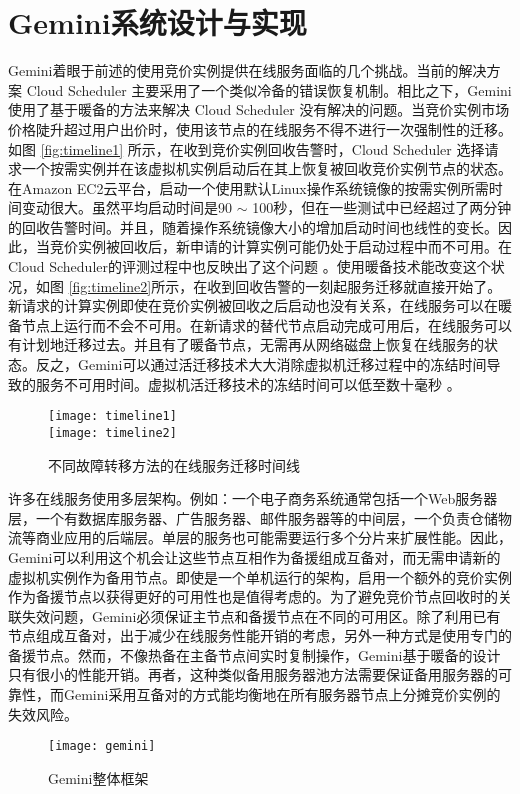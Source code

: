\section{Gemini系统设计与实现}
\label{sec-gemini}
Gemini着眼于前述的使用竞价实例提供在线服务面临的几个挑战。当前的解决方案 Cloud Scheduler \cite{He:2015:CCH:2749246.2749275} 主要采用了一个类似冷备的错误恢复机制。相比之下，Gemini使用了基于暖备的方法来解决 Cloud Scheduler 没有解决的问题。当竞价实例市场价格陡升超过用户出价时，使用该节点的在线服务不得不进行一次强制性的迁移。如图 \ref{fig:timeline1} 所示，在收到竞价实例回收告警时，Cloud Scheduler 选择请求一个按需实例并在该虚拟机实例启动后在其上恢复被回收竞价实例节点的状态。在Amazon EC2云平台，启动一个使用默认Linux操作系统镜像的按需实例所需时间变动很大。虽然平均启动时间是90 $\sim$ 100秒，但在一些测试中已经超过了两分钟的回收告警时间。并且，随着操作系统镜像大小的增加启动时间也线性的变长。因此，当竞价实例被回收后，新申请的计算实例可能仍处于启动过程中而不可用。在Cloud Scheduler的评测过程中也反映出了这个问题 \cite{He:2015:CCH:2749246.2749275}。使用暖备技术能改变这个状况，如图 \ref{fig:timeline2}所示，在收到回收告警的一刻起服务迁移就直接开始了。新请求的计算实例即使在竞价实例被回收之后启动也没有关系，在线服务可以在暖备节点上运行而不会不可用。在新请求的替代节点启动完成可用后，在线服务可以有计划地迁移过去。并且有了暖备节点，无需再从网络磁盘上恢复在线服务的状态。反之，Gemini可以通过活迁移技术大大消除虚拟机迁移过程中的冻结时间导致的服务不可用时间。虚拟机活迁移技术的冻结时间可以低至数十毫秒 \cite{Clark:2005:LMV:1251203.1251223}。
\begin{figure}
  \centering%
    {\texttt{[image: timeline1]}}%
  \\
  \vspace{5em}%
      {\texttt{[image: timeline2]}}
  \vspace{5em}%
  \caption{不同故障转移方法的在线服务迁移时间线}
  \label{fig:timeline}
\end{figure}

许多在线服务使用多层架构。例如：一个电子商务系统通常包括一个Web服务器层，一个有数据库服务器、广告服务器、邮件服务器等的中间层，一个负责仓储物流等商业应用的后端层。单层的服务也可能需要运行多个分片来扩展性能。因此，Gemini可以利用这个机会让这些节点互相作为备援组成互备对，而无需申请新的虚拟机实例作为备用节点。即使是一个单机运行的架构，启用一个额外的竞价实例作为备援节点以获得更好的可用性也是值得考虑的。为了避免竞价节点回收时的关联失效问题，Gemini必须保证主节点和备援节点在不同的可用区。除了利用已有节点组成互备对，出于减少在线服务性能开销的考虑，另外一种方式是使用专门的备援节点。然而，不像热备在主备节点间实时复制操作，Gemini基于暖备的设计只有很小的性能开销。再者，这种类似备用服务器池方法需要保证备用服务器的可靠性，而Gemini采用互备对的方式能均衡地在所有服务器节点上分摊竞价实例的失效风险。
\begin{figure}[]
  \centering
  \texttt{[image: gemini]}
  \caption{Gemini整体框架}
  \label{figure:gemini}
\end{figure}

